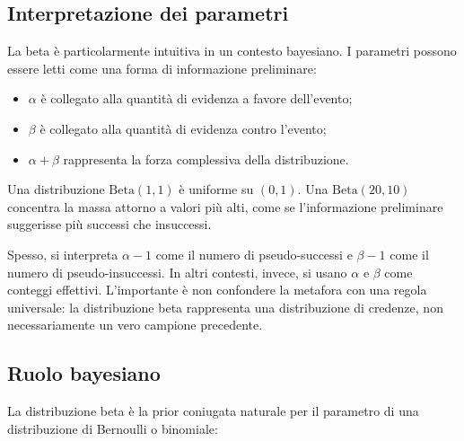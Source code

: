 \documentclass[
  italian,
  letterpaper,
  a4paper,
  11pt,
  open=any]{scrbook}
\providecommand{\tightlist}{%
  \setlength{\itemsep}{0pt}\setlength{\parskip}{0pt}}
\theoremstyle{plain}
\theoremstyle{definition}
\theoremstyle{definition}
\theoremstyle{remark}
\begin{document}
\subsection{Interpretazione dei
parametri}\label{interpretazione-dei-parametri-1}

La beta è particolarmente intuitiva in un contesto bayesiano. I
parametri possono essere letti come una forma di informazione
preliminare:

\begin{itemize}
\tightlist
\item
  \(\alpha\) è collegato alla quantità di evidenza a favore dell'evento;
\item
  \(\beta\) è collegato alla quantità di evidenza contro l'evento;
\item
  \(\alpha + \beta\) rappresenta la forza complessiva della
  distribuzione.
\end{itemize}

Una distribuzione \(\mathrm{Beta}(1,1)\) è uniforme su \((0,1)\). Una
\(\mathrm{Beta}(20,10)\) concentra la massa attorno a valori più alti,
come se l'informazione preliminare suggerisse più successi che
insuccessi.

\begin{tcolorbox}[enhanced jigsaw, arc=.35mm, bottomrule=.15mm, bottomtitle=1mm, breakable, colback=white, colbacktitle=quarto-callout-note-color!10!white, colframe=quarto-callout-note-color-frame, coltitle=black, left=2mm, leftrule=.75mm, opacityback=0, opacitybacktitle=0.6, rightrule=.15mm, title=\textcolor{quarto-callout-note-color}{\faInfo}\hspace{0.5em}{Pseudo-osservazioni: una convenzione utile}, titlerule=0mm, toprule=.15mm, toptitle=1mm]

Spesso, si interpreta \(\alpha-1\) come il numero di pseudo-successi e
\(\beta-1\) come il numero di pseudo-insuccessi. In altri contesti,
invece, si usano \(\alpha\) e \(\beta\) come conteggi effettivi.
L'importante è non confondere la metafora con una regola universale: la
distribuzione beta rappresenta una distribuzione di credenze, non
necessariamente un vero campione precedente.

\end{tcolorbox}

\subsection{Ruolo bayesiano}\label{ruolo-bayesiano-1}

La distribuzione beta è la prior coniugata naturale per il parametro di
una distribuzione di Bernoulli o binomiale:
\end{document}
